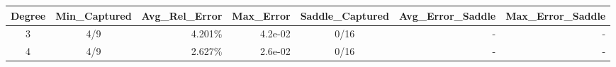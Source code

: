 \begin{tabular}{ccrrcrr}
  \toprule
  \textbf{Degree} & \textbf{Min\_Captured} & \textbf{Avg\_Rel\_Error} & \textbf{Max\_Error} & \textbf{Saddle\_Captured} & \textbf{Avg\_Error\_Saddle} & \textbf{Max\_Error\_Saddle} \\\midrule
  3 & 4/9 & 4.201\% & 4.2e-02 & 0/16 & - & - \\
  4 & 4/9 & 2.627\% & 2.6e-02 & 0/16 & - & - \\\bottomrule
\end{tabular}
